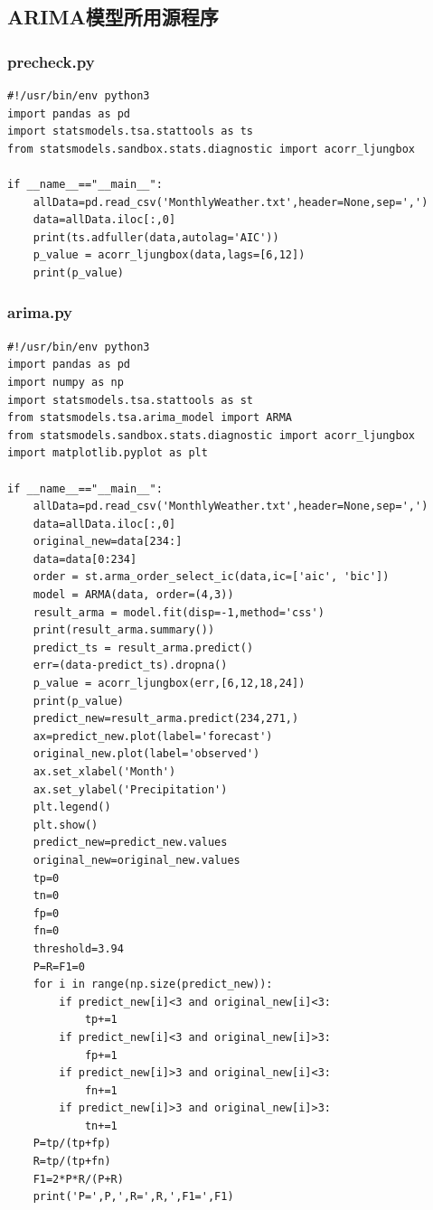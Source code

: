 \documentclass{ctexart}
\begin{document}
\subsection*{ARIMA模型所用源程序}

\subsubsection*{precheck.py}
\begin{scriptsize}
\begin{verbatim}
#!/usr/bin/env python3
import pandas as pd
import statsmodels.tsa.stattools as ts
from statsmodels.sandbox.stats.diagnostic import acorr_ljungbox

if __name__=="__main__":
    allData=pd.read_csv('MonthlyWeather.txt',header=None,sep=',')
    data=allData.iloc[:,0]
    print(ts.adfuller(data,autolag='AIC'))
    p_value = acorr_ljungbox(data,lags=[6,12])
    print(p_value)
\end{verbatim}
\end{scriptsize}

\subsubsection*{arima.py}
\begin{scriptsize}
\begin{verbatim}
#!/usr/bin/env python3
import pandas as pd
import numpy as np
import statsmodels.tsa.stattools as st
from statsmodels.tsa.arima_model import ARMA
from statsmodels.sandbox.stats.diagnostic import acorr_ljungbox
import matplotlib.pyplot as plt

if __name__=="__main__":
    allData=pd.read_csv('MonthlyWeather.txt',header=None,sep=',')
    data=allData.iloc[:,0]
    original_new=data[234:]
    data=data[0:234]
    order = st.arma_order_select_ic(data,ic=['aic', 'bic'])
    model = ARMA(data, order=(4,3))
    result_arma = model.fit(disp=-1,method='css')
    print(result_arma.summary())
    predict_ts = result_arma.predict()
    err=(data-predict_ts).dropna()
    p_value = acorr_ljungbox(err,[6,12,18,24])
    print(p_value)
    predict_new=result_arma.predict(234,271,)
    ax=predict_new.plot(label='forecast')
    original_new.plot(label='observed')
    ax.set_xlabel('Month')
    ax.set_ylabel('Precipitation')
    plt.legend()
    plt.show()
    predict_new=predict_new.values
    original_new=original_new.values
    tp=0
    tn=0
    fp=0
    fn=0
    threshold=3.94
    P=R=F1=0
    for i in range(np.size(predict_new)):
        if predict_new[i]<3 and original_new[i]<3:
            tp+=1
        if predict_new[i]<3 and original_new[i]>3:
            fp+=1
        if predict_new[i]>3 and original_new[i]<3:
            fn+=1
        if predict_new[i]>3 and original_new[i]>3:
            tn+=1
    P=tp/(tp+fp)
    R=tp/(tp+fn)
    F1=2*P*R/(P+R)
    print('P=',P,',R=',R,',F1=',F1)
\end{verbatim}
\end{scriptsize}
\end{document}
